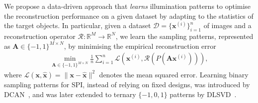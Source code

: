 \documentclass[lettersize,journal]{IEEEtran}
\providecommand{\R}{{\mathbb R}}
\providecommand{\BA}{{\mathbf A}}
\providecommand{\Bx}{{\mathbf x}}
\begin{document}
We propose a data-driven approach that \emph{learns} illumination patterns to optimise the reconstruction performance on a given dataset by adapting to the statistics of the target objects. 
In particular, given a dataset $\mathcal{D}= \{ \Bx^{(i)} \}_{i=1}^n$ of images and a reconstruction operator $\mathcal{R}: \R^M \to \R^N$, we learn the sampling patterns, represented as $\BA \in \{-1,1\}^{M \times N}$, by minimising the empirical reconstruction error
\begin{align}
    \label{eq:pattern_learning}
    \min_{\BA \in \{-1,1\}^{M \times N}} \frac{1}{n} \sum_{i=1}^n \mathcal{L}(\Bx^{(i)}, \mathcal{R}(P(\BA \Bx^{(i)}))),
\end{align}
where $\mathcal{L}(\Bx, \hat{\Bx}) = \| \Bx - \hat{\Bx}\|^2$ denotes the mean squared error. 
Learning binary sampling patterns for SPI, instead of relying on fixed designs, was introduced by DCAN~\cite{Higham_2018_DeepLearningRealtime}, and was later extended to ternary $\{-1,0,1\}$ patterns by DLSVD~\cite{Deng_2024_SinglePixelImagingBased}. 
\end{document}
